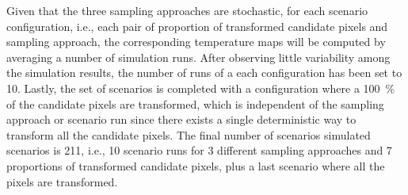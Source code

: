 \documentclass[10pt,letterpaper]{article}
\begin{document}
Given that the three sampling approaches are stochastic, for each scenario configuration, i.e., each pair of proportion of transformed candidate pixels and sampling approach, the corresponding temperature maps will be computed by averaging a number of simulation runs. 
After observing little variability among the simulation results, the number of runs of a each configuration has been set to 10.
Lastly, the set of scenarios is completed with a configuration where a 100~\% of the candidate pixels are transformed, which is independent of the sampling approach or scenario run since there exists a single deterministic way to transform all the candidate pixels.
The final number of scenarios simulated scenarios is 211, i.e., 10 scenario runs for 3 different sampling approaches and 7 proportions of transformed candidate pixels, plus a last scenario where all the pixels are transformed.




  
\end{document}
